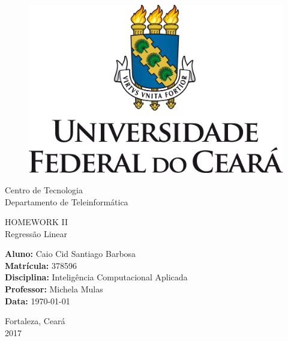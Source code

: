 \documentclass[a4paper,11pt]{article}
\begin{document}
	\begin{titlepage}
	\begin{center}
	\begin{figure}
	\centering
		\includegraphics[scale=0.4]{fig/UFCLOGO.png}
	\end{figure}
	\Huge{Centro de Tecnologia}\\
	\Huge{Departamento de Teleinformática}
	\end{center}
	\vspace{2cm}
	\begin{center}
		\Huge{HOMEWORK II}\\
		\Huge{Regressão Linear}
	\end{center} 
	\vspace{2cm}
	\noindent\textbf{Aluno:} Caio Cid Santiago Barbosa \\
	\textbf{Matrícula:} 378596\\
	\textbf{Disciplina:} Inteligência Computacional Aplicada \\
	\textbf{Professor:} Michela Mulas \\
	\textbf{Data:} \today
	\vfill
	\begin{center}
	Fortaleza, Ceará \\
	2017
	\end{center}
	\end{titlepage}
\end{document}
